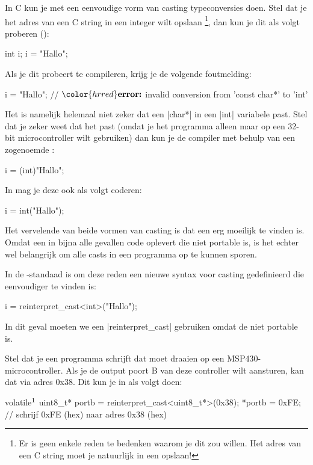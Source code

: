 \begin{cpplstShortInline}
In C kun je met een eenvoudige vorm van casting typeconversies doen.
Stel dat je het adres van een C string in een integer wilt opslaan%
\footnote{%
    Er is geen enkele reden te bedenken waarom je dit zou willen. 
    Het adres van een C string moet je natuurlijk in een  opslaan!%
}, dan kun je dit als volgt proberen ():
\begin{cpplstfragment}
    int i;
    i = "Hallo";
\end{cpplstfragment}

Als je dit probeert te compileren, krijg je de volgende foutmelding:
\begin{cpplstfragment}[mathescape=true]
    i = "Hallo";
//  $\color{hrred}\textbf{error:}$ invalid conversion from 'const char*' to 'int'
\end{cpplstfragment}
Het is namelijk helemaal niet zeker dat een |char*| in een |int| variabele past.
Stel dat je zeker weet dat het past (omdat je het programma alleen maar op een 32-bit microcontroller wilt gebruiken) dan kun je de compiler  met behulp van een zogenoemde \emph{}:
\begin{cpplstfragment}
    i = (int)"Hallo";
\end{cpplstfragment}

In \Cpp{} mag je deze  ook als volgt coderen:
\begin{cpplstfragment}
    i = int("Hallo");
\end{cpplstfragment}

Het vervelende van beide vormen van casting is dat een  erg moeilijk te vinden is.
Omdat een  in bijna alle gevallen code oplevert die niet portable is, is het echter wel belangrijk om alle casts in een programma op te kunnen sporen.

In de \Cpp{}\hyp{}standaad is om deze reden een nieuwe syntax voor casting gedefinieerd die eenvoudiger te vinden is:
\begin{cpplstfragment}
    i = reinterpret_cast<int>("Hallo");
\end{cpplstfragment}

In dit geval moeten we een |reinterpret_cast| gebruiken omdat de  niet portable is.

Stel dat je een \Cpp{} programma schrijft dat moet draaien op een MSP430-microcontroller.
Als je de output poort B van deze controller wilt aansturen, kan dat via adres 0x38.
Dit kun je in \Cpp{} als volgt doen:
\begin{cpplstfragment}[mathescape=true]
    volatile$\footnotemark$  uint8_t* portb = reinterpret_cast<uint8_t*>(0x38);
    *portb = 0xFE; // schrijf 0xFE (hex) naar adres 0x38 (hex)
\end{cpplstfragment}


\end{cpplstShortInline}
